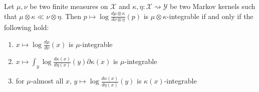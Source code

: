 \begin{lemma}
  \label{lem:integrable_llr_compProd_iff}
  \leanok
  \uses{}
  Let $\mu, \nu$ be two finite measures on $\mathcal X$ and $\kappa, \eta : \mathcal X \rightsquigarrow \mathcal Y$ be two Markov kernels such that $\mu \otimes \kappa \ll \nu \otimes \eta$. Then $p \mapsto \log \frac{d \mu \otimes \kappa}{d \nu \otimes \eta}(p)$ is $\mu \otimes \kappa$-integrable if and only if the following hold:
  \begin{enumerate}
    \item $x \mapsto \log \frac{d \mu}{d \nu}(x)$ is $\mu$-integrable \label{:1}
    \item $x \mapsto \int_y  \log \frac{d \kappa(x)}{d \eta(x)}(y) \partial \kappa(x)$ is $\mu$-integrable \label{:2}
    \item for $\mu$-almost all $x$, $y \mapsto \log \frac{d \kappa(x)}{d \eta(x)}(y)$ is $\kappa(x)$-integrable \label{:3}
  \end{enumerate}
\end{lemma}

